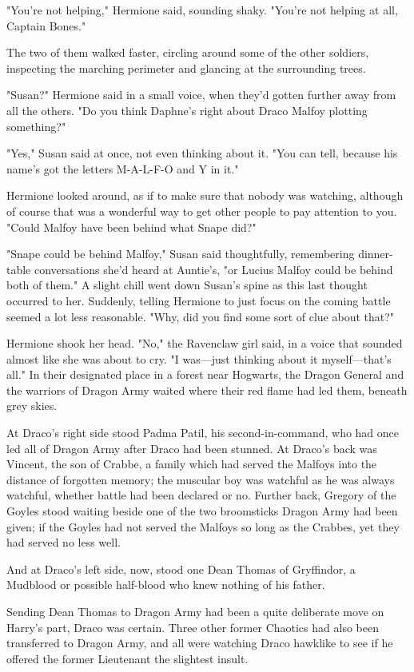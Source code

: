 "You're not helping," Hermione said, sounding shaky. "You're not helping at
all, Captain Bones."

The two of them walked faster, circling around some of the other soldiers,
inspecting the marching perimeter and glancing at the surrounding trees.

"Susan?" Hermione said in a small voice, when they'd gotten further away from
all the others. "Do you think Daphne's right about Draco Malfoy plotting
something?"

"Yes," Susan said at once, not even thinking about it. "You can tell, because
his name's got the letters M-A-L-F-O and Y in it."

Hermione looked around, as if to make sure that nobody was watching, although
of course that was a wonderful way to get other people to pay attention to you.
"Could Malfoy have been behind what Snape did?"

"Snape could be behind Malfoy," Susan said thoughtfully, remembering
dinner-table conversations she'd heard at Auntie's, "or Lucius Malfoy could be
behind both of them." A slight chill went down Susan's spine as this last
thought occurred to her. Suddenly, telling Hermione to just focus on the coming
battle seemed a lot less reasonable. "Why, did you find some sort of clue about
that?"

Hermione shook her head. "No," the Ravenclaw girl said, in a voice that sounded
almost like she was about to cry. "I was---just thinking about it
myself---that's all."
\sbreak
In their designated place in a forest near Hogwarts, the Dragon General and the
warriors of Dragon Army waited where their red flame had led them, beneath grey
skies.

At Draco's right side stood Padma Patil, his second-in-command, who had once
led all of Dragon Army after Draco had been stunned. At Draco's back was
Vincent, the son of Crabbe, a family which had served the Malfoys into the
distance of forgotten memory; the muscular boy was watchful as he was always
watchful, whether battle had been declared or no. Further back, Gregory of the
Goyles stood waiting beside one of the two broomsticks Dragon Army had been
given; if the Goyles had not served the Malfoys so long as the Crabbes, yet
they had served no less well.

And at Draco's left side, now, stood one Dean Thomas of Gryffindor, a Mudblood
or possible half-blood who knew nothing of his father.

Sending Dean Thomas to Dragon Army had been a quite deliberate move on Harry's
part, Draco was certain. Three other former Chaotics had also been transferred
to Dragon Army, and all were watching Draco hawklike to see if he offered the
former Lieutenant the slightest insult.

